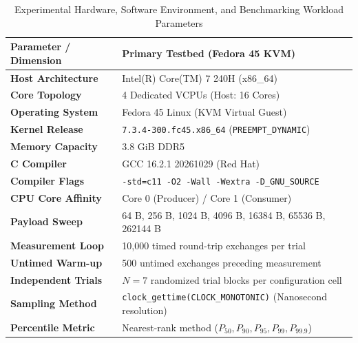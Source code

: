 \begin{table}[!t]
\centering
\caption{Experimental Hardware, Software Environment, and Benchmarking Workload Parameters}
\label{tab:environment}
\scriptsize
\renewcommand{\arraystretch}{0.92}
\begin{tabular*}{\columnwidth}{@{\extracolsep{\fill}}lp{4.7cm}}
\toprule
\textbf{Parameter / Dimension} & \textbf{Primary Testbed (Fedora 45 KVM)} \\
\midrule
\textbf{Host Architecture} & Intel(R) Core(TM) 7 240H (x86\_64) \\
\textbf{Core Topology} & 4 Dedicated VCPUs (Host: 16 Cores) \\
\textbf{Operating System} & Fedora 45 Linux (KVM Virtual Guest) \\
\textbf{Kernel Release} & \texttt{7.3.4-300.fc45.x86\_64} (\texttt{PREEMPT\_DYNAMIC}) \\
\textbf{Memory Capacity} & 3.8 GiB DDR5 \\
\textbf{C Compiler} & GCC 16.2.1 20261029 (Red Hat) \\
\textbf{Compiler Flags} & \texttt{-std=c11 -O2 -Wall -Wextra -D\_GNU\_SOURCE} \\
\textbf{CPU Core Affinity} & Core 0 (Producer) / Core 1 (Consumer) \\
\midrule
\textbf{Payload Sweep} & 64 B, 256 B, 1024 B, 4096 B, 16384 B, 65536 B, 262144 B \\
\textbf{Measurement Loop} & 10,000 timed round-trip exchanges per trial \\
\textbf{Untimed Warm-up} & 500 untimed exchanges preceding measurement \\
\textbf{Independent Trials} & $N = 7$ randomized trial blocks per configuration cell \\
\textbf{Sampling Method} & \texttt{clock\_gettime(CLOCK\_MONOTONIC)} (Nanosecond resolution) \\
\textbf{Percentile Metric} & Nearest-rank method ($P_{50}, P_{90}, P_{95}, P_{99}, P_{99.9}$) \\
\bottomrule
\end{tabular*}
\end{table}